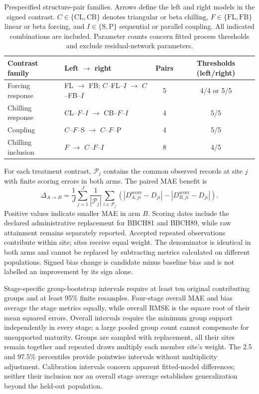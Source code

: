 \documentclass[a4paper,11pt]{article}
\begin{document}
\begin{table}[!htbp]
\centering
\caption{Prespecified structure-pair families. Arrows define the left and right
models in the signed contrast. $C\in\{\mathrm{CL},\mathrm{CB}\}$ denotes
triangular or beta chilling, $F\in\{\mathrm{FL},\mathrm{FB}\}$ linear or beta
forcing, and $I\in\{\mathrm{S},\mathrm{P}\}$ sequential or parallel coupling.
All indicated combinations are included. Parameter counts concern fitted
process thresholds and exclude residual-network parameters.}
\label{tab:structure_contrasts}
\small
\begin{tabularx}{\textwidth}{@{}lXcc@{}}
\toprule
Contrast family & Left $\rightarrow$ right & Pairs & Thresholds (left/right) \\
\midrule
Forcing response & FL $\rightarrow$ FB; $C$--FL--$I$ $\rightarrow$ $C$--FB--$I$ & 5 & 4/4 or 5/5 \\
Chilling response & CL--$F$--$I$ $\rightarrow$ CB--$F$--$I$ & 4 & 5/5 \\
Coupling & $C$--$F$--S $\rightarrow$ $C$--$F$--P & 4 & 5/5 \\
Chilling inclusion & $F$ $\rightarrow$ $C$--$F$--$I$ & 8 & 4/5 \\
\bottomrule
\end{tabularx}
\end{table}

For each treatment contrast, $\mathcal{P}_j$ contains the common observed records at site $j$ with finite scoring errors in both arms. The paired MAE benefit is
\begin{equation}
\Delta_{A\rightarrow B}=\frac{1}{J}\sum_{j=1}^{J}
\frac{1}{|\mathcal{P}_j|}\sum_{i\in\mathcal{P}_j}
\left(|D^{\mathrm{score}}_{A,ji}-D_{ji}|-|D^{\mathrm{score}}_{B,ji}-D_{ji}|\right).
\label{eq:structure_contrast}
\end{equation}
Positive values indicate smaller MAE in arm $B$. Scoring dates include the declared administrative replacement for BBCH81 and BBCH89, while raw attainment remains separately reported. Accepted repeated observations contribute within site; sites receive equal weight. The denominator is identical in both arms and cannot be replaced by subtracting metrics calculated on different populations. Signed bias change is candidate minus baseline bias and is not labelled an improvement by its sign alone.

Stage-specific group-bootstrap intervals require at least ten original contributing groups and at least 95\% finite resamples. Four-stage overall MAE and bias average the stage metrics equally, while overall RMSE is the square root of their mean squared errors. Overall intervals require the minimum group support independently in every stage; a large pooled group count cannot compensate for unsupported maturity. Groups are sampled with replacement, all their sites remain together and repeated draws multiply each member site's weight. The 2.5 and 97.5\% percentiles provide pointwise intervals without multiplicity adjustment. Calibration intervals concern apparent fitted-model differences; neither their inclusion nor an overall stage average establishes generalization beyond the held-out population.
\end{document}
